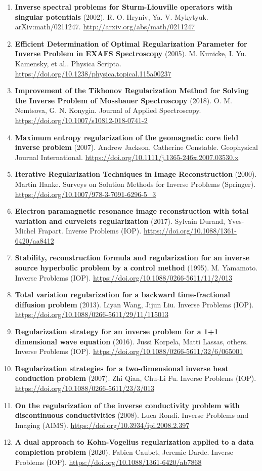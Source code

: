 \documentclass[11pt,a4paper]{article}
\begin{document}
\begin{enumerate}[leftmargin=1.4em]
\item \textbf{Inverse spectral problems for Sturm-Liouville operators with singular potentials} (2002). R. O. Hryniv, Ya. V. Mykytyuk. arXiv:math/0211247. \url{http://arxiv.org/abs/math/0211247}
\item \textbf{Efficient Determination of Optimal Regularization Parameter for Inverse Problem in EXAFS Spectroscopy} (2005). M. Kunicke, I. Yu. Kamensky, et al.. Physica Scripta. \url{https://doi.org/10.1238/physica.topical.115a00237}
\item \textbf{Improvement of the Tikhonov Regularization Method for Solving the Inverse Problem of Mossbauer Spectroscopy} (2018). O. M. Nemtsova, G. N. Konygin. Journal of Applied Spectroscopy. \url{https://doi.org/10.1007/s10812-018-0741-2}
\item \textbf{Maximum entropy regularization of the geomagnetic core field inverse problem} (2007). Andrew Jackson, Catherine Constable. Geophysical Journal International. \url{https://doi.org/10.1111/j.1365-246x.2007.03530.x}
\item \textbf{Iterative Regularization Techniques in Image Reconstruction} (2000). Martin Hanke. Surveys on Solution Methods for Inverse Problems (Springer). \url{https://doi.org/10.1007/978-3-7091-6296-5_3}
\item \textbf{Electron paramagnetic resonance image reconstruction with total variation and curvelets regularization} (2017). Sylvain Durand, Yves-Michel Frapart. Inverse Problems (IOP). \url{https://doi.org/10.1088/1361-6420/aa8412}
\item \textbf{Stability, reconstruction formula and regularization for an inverse source hyperbolic problem by a control method} (1995). M. Yamamoto. Inverse Problems (IOP). \url{https://doi.org/10.1088/0266-5611/11/2/013}
\item \textbf{Total variation regularization for a backward time-fractional diffusion problem} (2013). Liyan Wang, Jijun Liu. Inverse Problems (IOP). \url{https://doi.org/10.1088/0266-5611/29/11/115013}
\item \textbf{Regularization strategy for an inverse problem for a 1+1 dimensional wave equation} (2016). Jussi Korpela, Matti Lassas, others. Inverse Problems (IOP). \url{https://doi.org/10.1088/0266-5611/32/6/065001}
\item \textbf{Regularization strategies for a two-dimensional inverse heat conduction problem} (2007). Zhi Qian, Chu-Li Fu. Inverse Problems (IOP). \url{https://doi.org/10.1088/0266-5611/23/3/013}
\item \textbf{On the regularization of the inverse conductivity problem with discontinuous conductivities} (2008). Luca Rondi. Inverse Problems and Imaging (AIMS). \url{https://doi.org/10.3934/ipi.2008.2.397}
\item \textbf{A dual approach to Kohn-Vogelius regularization applied to a data completion problem} (2020). Fabien Caubet, Jeremie Darde. Inverse Problems (IOP). \url{https://doi.org/10.1088/1361-6420/ab7868}
\end{enumerate}
\end{document}
